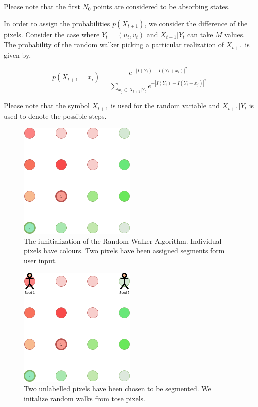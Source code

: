 \documentclass[a4paper]{article}
\begin{document}
Please note that the first $N_0$ points are considered to be absorbing states.

In order to assign the probabilities $p(X_{t+1})$, we consider the difference of the pixels. Consider the case where $Y_t = (u_t,v_t)$ and $X_{t+1} | Y_{t}$ can take $M$ values. The probability of the random walker picking a particular realization of $X_{t+1}$ is given by,

\begin{equation}
p(X_{t+1} = x_i) = \frac{e^{-|I(Y_t) - I(Y_t + x_i)|^2}} { \sum_{x_j \in X_{t+1}|Y_t } e^{-|I(Y_t) - I(Y_t + x_j)|^2} }
\label{eqn:xt-equation-walker}
\end{equation}

Please note that the symbol $X_{t+1}$ is used for the random variable and $X_{t+1}|Y_t$ is used to denote the possible steps.

\begin{figure}
    \centering
    \includegraphics[width=0.5\textwidth]{rw-1.png}
    \caption{The iunitialization of the Random Walker Algorithm. Individual pixels have colours. Two pixels have been assigned segments form user input.}
    \label{fig:rw1}
\end{figure}


\begin{figure}
    \centering
    \includegraphics[width=0.5\textwidth]{rw-2.png}
    \caption{Two unlabelled pixels have been chosen to be segmented. We initalize random walks from tose pixels.}
    \label{fig:rw2}
\end{figure}
\end{document}
